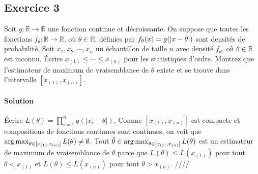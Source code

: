 \documentclass[../main.tex]{subfiles}
\begin{document}
\begin{CJK*}{UTF8}{gbsn}

\section*{Exercice 3}

Soit $g : \mathbb{R} \to \mathbb{R}$ une fonction continue et décroissante. 
On suppose que toutes les fonctions $f_{\theta} : \mathbb{R} \to \mathbb{R}$, 
où $\theta \in \mathbb{R}$, définies par $f_{\theta}(x) = g(\abs{x - \theta})$
sont densités de probabilité.
Soit $x_1, x_2, \cdots, x_n$ un échantillon de taille $n$ avec densité
$f_{\theta}$, où $\theta \in \mathbb{R}$ est inconnu.
Écrire $x_{(1)} \leqslant \cdots \leqslant x_{(n)}$ pour les statistiques d'ordre.
Montrez que l'estimateur de maximum de vraisemblance de $\theta$ existe et se trouve 
dans l'intervalle $[x_{(1)}, x_{(n)}]$.

\paragraph{Solution}
Écrire $L(\theta) = \prod_{i=1}^{n} g(|x_i - \theta|)$.
Comme $[x_{(1)}, x_{(n)}]$ est compacte et compositions de fonctions continues sont continues,
on voit que $\operatorname*{arg\,max}_{\theta \in [x_{(1)}, x_{(n)}]} L(\theta) \neq \emptyset$.
Tout $\hat{\theta} \in \operatorname*{arg\,max}_{\theta \in [x_{(1)}, x_{(n)}]} L(\theta)$ est un estimateur de maximum de vraisemblance de $\theta$
parce que $L(\theta) \leqslant L(x_{(1)})$ pour tout $\theta < x_{(1)}$ 
et $L(\theta) \leqslant L(x_{(n)})$ pour tout $\theta > x_{(n)}$. ////

\end{CJK*}
\end{document}
